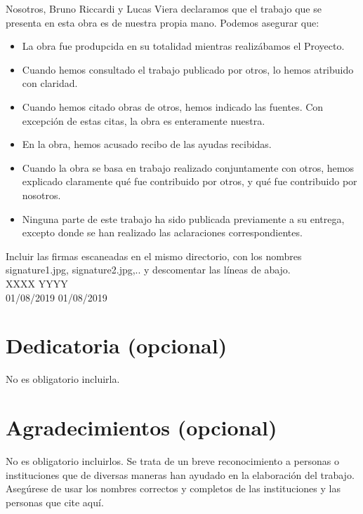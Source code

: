 \documentclass[12pt,a4paper,oneside]{book}
\begin{document}
Nosotros, Bruno Riccardi y Lucas Viera declaramos que el trabajo que se presenta en esta obra es de nuestra
propia mano. Podemos asegurar que:
\begin{itemize}
\item La obra fue produpcida en su totalidad mientras realizábamos el Proyecto.
\item Cuando hemos consultado el trabajo publicado por otros, lo hemos atribuido con claridad.
\item Cuando hemos citado obras de otros, hemos indicado las fuentes. Con excepción de estas citas, la obra es enteramente nuestra.
\item En la obra, hemos acusado recibo de las ayudas recibidas.
\item Cuando la obra se basa en trabajo realizado conjuntamente con otros, hemos explicado claramente qué fue contribuido por otros, y qué fue contribuido por nosotros.
\item Ninguna parte de este trabajo ha sido publicada previamente a su entrega, excepto donde se han realizado las aclaraciones correspondientes.
\end{itemize}

 
\vspace{2cm}


\noindent Incluir las firmas escaneadas en el mismo directorio, con los nombres signature1.jpg, signature2.jpg,.. y descomentar las líneas de abajo.\\


XXXX \hfill YYYY \\

01/08/2019 \hfill 01/08/2019



\chapter*{Dedicatoria (opcional)}

No es obligatorio incluirla.



\chapter*{Agradecimientos (opcional)}
No es obligatorio incluirlos. Se trata de un breve reconocimiento a personas o instituciones que de diversas maneras han ayudado en la elaboración del trabajo. 
Asegúrese de usar los nombres correctos y completos de las instituciones y las personas que cite aquí.
\end{document}
